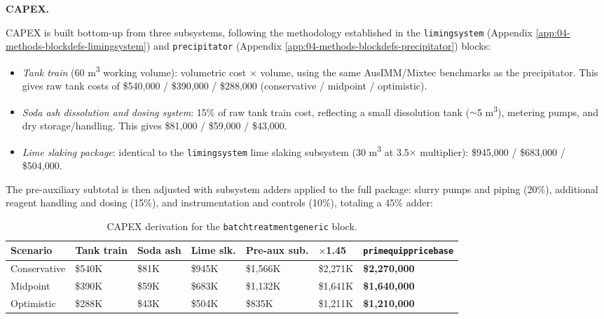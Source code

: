 \documentclass{article}
\renewcommand\_{\textunderscore\allowbreak}
\begin{document}
\medskip
\noindent\textbf{CAPEX.}\quad

CAPEX is built bottom-up from three subsystems, following the methodology established in the \texttt{liming\_system} (Appendix \ref{app:04-methods-blockdefs-limingsystem}) and \texttt{precipitator} (Appendix \ref{app:04-methods-blockdefs-precipitator}) blocks:

\begin{itemize}[noitemsep]
	\item \textit{Tank train} (60 \si{m^3} working volume): volumetric cost $\times$ volume, using the same AusIMM/Mixtec benchmarks as the precipitator. This gives raw tank costs of \$540,000 / \$390,000 / \$288,000 (conservative / midpoint / optimistic).
	\item \textit{Soda ash dissolution and dosing system}: 15\% of raw tank train cost, reflecting a small dissolution tank ($\sim$5 \si{m^3}), metering pumps, and dry storage/handling. This gives \$81,000 / \$59,000 / \$43,000.
	\item \textit{Lime slaking package}: identical to the \texttt{liming\_system} lime slaking subsystem (30 \si{m^3} at 3.5$\times$ multiplier): \$945,000 / \$683,000 / \$504,000.
\end{itemize}

The pre-auxiliary subtotal is then adjusted with subsystem adders applied to the full package: slurry pumps and piping (20\%), additional reagent handling and dosing (15\%), and instrumentation and controls (10\%), totaling a 45\% adder:

\begin{table}[h!]
\caption{CAPEX derivation for the \texttt{batch\_treatment\_generic} block.}
\centering
\begin{tabular}{>{\raggedright\arraybackslash}p{2.2cm}
				>{\raggedright\arraybackslash}p{2.0cm}
				>{\raggedright\arraybackslash}p{1.6cm}
				>{\raggedright\arraybackslash}p{1.6cm}
				>{\raggedright\arraybackslash}p{2.0cm}
				>{\raggedright\arraybackslash}p{1.6cm}
				>{\raggedright\arraybackslash}p{3cm}}
\toprule
\textbf{Scenario} & \textbf{Tank train} & \textbf{Soda ash} & \textbf{Lime slk.} & \textbf{Pre-aux sub.} & \textbf{$\times$1.45} & \texttt{prim\_equip\_price\_base} \\
\midrule
Conservative & \$540K & \$81K & \$945K & \$1,566K & \$2,271K & \textbf{\$2,270,000} \\
Midpoint     & \$390K & \$59K & \$683K & \$1,132K & \$1,641K & \textbf{\$1,640,000} \\
Optimistic   & \$288K & \$43K & \$504K & \$835K  & \$1,211K & \textbf{\$1,210,000} \\
\bottomrule
\end{tabular}
\end{table}
\end{document}
